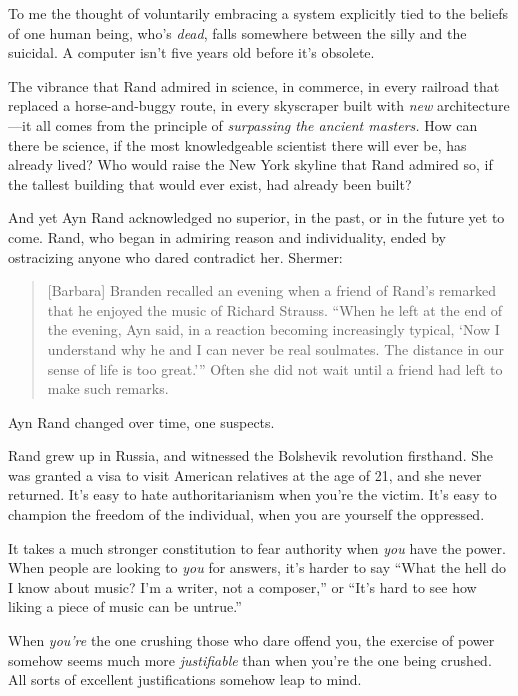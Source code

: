 {
 To me the thought of voluntarily embracing a system explicitly
tied to the beliefs of one human being, who's
\textit{dead}, falls somewhere between the silly and the suicidal. A
computer isn't five years old before
it's obsolete.}

{
 The vibrance that Rand admired in science, in commerce, in every
railroad that replaced a horse-and-buggy route, in every skyscraper
built with \textit{new} architecture---it all comes from the principle
of \textit{surpassing the ancient masters.} How can there be science,
if the most knowledgeable scientist there will ever be, has already
lived? Who would raise the New York skyline that Rand admired so, if
the tallest building that would ever exist, had already been built?}

{
 And yet Ayn Rand acknowledged no superior, in the past, or in the
future yet to come. Rand, who began in admiring reason and
individuality, ended by ostracizing anyone who dared contradict her.
Shermer:}

\begin{quote}
{
 [Barbara] Branden recalled an evening when a friend of
Rand's remarked that he enjoyed the music of Richard
Strauss. ``When he left at the end of the evening, Ayn
said, in a reaction becoming increasingly typical, `Now
I understand why he and I can never be real soulmates. The distance in
our sense of life is too great.'''
Often she did not wait until a friend had left to make such remarks.}
\end{quote}

{
 Ayn Rand changed over time, one suspects.}

{
 Rand grew up in Russia, and witnessed the Bolshevik revolution
firsthand. She was granted a visa to visit American relatives at the
age of 21, and she never returned. It's easy to hate
authoritarianism when you're the victim.
It's easy to champion the freedom of the individual,
when you are yourself the oppressed.}

{
 It takes a much stronger constitution to fear authority when
\textit{you} have the power. When people are looking to \textit{you}
for answers, it's harder to say ``What
the hell do I know about music? I'm a writer, not a
composer,'' or
``It's hard to see how liking a piece
of music can be untrue.''}

{
 When \textit{you're} the one crushing those who
dare offend you, the exercise of power somehow seems much more
\textit{justifiable} than when you're the one being
crushed. All sorts of excellent justifications somehow leap to mind.}

